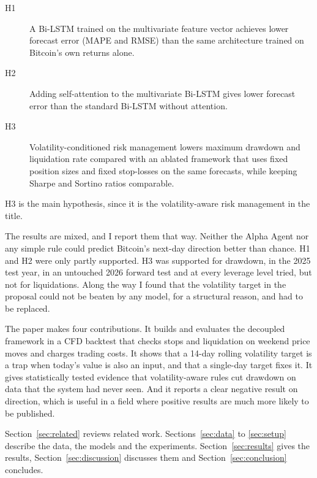 \begin{description}
  \item[H1] A Bi-LSTM trained on the multivariate feature vector achieves lower forecast error (MAPE and RMSE) than the same architecture trained on Bitcoin's own returns alone.
  \item[H2] Adding self-attention to the multivariate Bi-LSTM gives lower forecast error than the standard Bi-LSTM without attention.
  \item[H3] Volatility-conditioned risk management lowers maximum drawdown and liquidation rate compared with an ablated framework that uses fixed position sizes and fixed stop-losses on the same forecasts, while keeping Sharpe and Sortino ratios comparable.
\end{description}

H3 is the main hypothesis, since it is the volatility-aware risk management in the title.

The results are mixed, and I report them that way. Neither the Alpha Agent nor any simple rule could predict Bitcoin's next-day direction better than chance. H1 and H2 were only partly supported. H3 was supported for drawdown, in the 2025 test year, in an untouched 2026 forward test and at every leverage level tried, but not for liquidations. Along the way I found that the volatility target in the proposal could not be beaten by any model, for a structural reason, and had to be replaced.

The paper makes four contributions. It builds and evaluates the decoupled framework in a CFD backtest that checks stops and liquidation on weekend price moves and charges trading costs. It shows that a 14-day rolling volatility target is a trap when today's value is also an input, and that a single-day target fixes it. It gives statistically tested evidence that volatility-aware rules cut drawdown on data that the system had never seen. And it reports a clear negative result on direction, which is useful in a field where positive results are much more likely to be published.

Section~\ref{sec:related} reviews related work. Sections~\ref{sec:data} to \ref{sec:setup} describe the data, the models and the experiments. Section~\ref{sec:results} gives the results, Section~\ref{sec:discussion} discusses them and Section~\ref{sec:conclusion} concludes.
